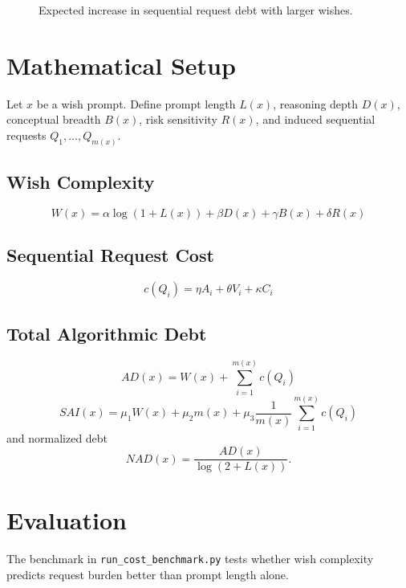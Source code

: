 \documentclass[11pt]{article}
\begin{document}
\begin{figure}[h]
\centering
{}
\caption{Expected increase in sequential request debt with larger wishes.}
\end{figure}

\section{Mathematical Setup}
Let $x$ be a wish prompt. Define prompt length $L(x)$, reasoning depth $D(x)$, conceptual breadth $B(x)$, risk sensitivity $R(x)$, and induced sequential requests $Q_1,\dots,Q_{m(x)}$.

\subsection{Wish Complexity}
\[
W(x)=\alpha \log(1+L(x))+\beta D(x)+\gamma B(x)+\delta R(x)
\]

\subsection{Sequential Request Cost}
\[
c(Q_i)=\eta A_i+\theta V_i+\kappa C_i
\]

\subsection{Total Algorithmic Debt}
\[
AD(x)=W(x)+\sum_{i=1}^{m(x)} c(Q_i)
\]
\[
SAI(x)=\mu_1 W(x)+\mu_2 m(x)+\mu_3 \frac{1}{m(x)}\sum_{i=1}^{m(x)} c(Q_i)
\]
and normalized debt
\[
NAD(x)=\frac{AD(x)}{\log(2+L(x))}.
\]

\section{Evaluation}
The benchmark in \texttt{run\_cost\_benchmark.py} tests whether wish complexity predicts request burden better than prompt length alone.
\end{document}

